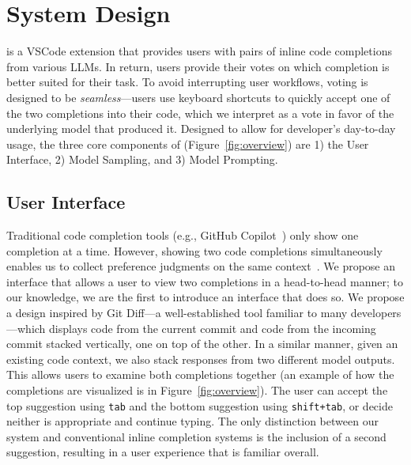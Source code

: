 \section{System Design}\label{sec:system}

\systemName is a VSCode extension that provides users with pairs of inline code completions from various LLMs.
In return, users provide their votes on which completion is better suited for their task.
To avoid interrupting user workflows, voting is designed to be \emph{seamless}---users use keyboard shortcuts to quickly accept one of the two completions into their code, which we interpret as a vote in favor of the underlying model that produced it.
Designed to allow for developer's day-to-day usage, the three core components of \systemName (Figure~\ref{fig:overview}) are 1) the User Interface, 2) Model Sampling, and 3) Model Prompting.




\subsection{User Interface}\label{subsec:pairwise}

Traditional code completion tools (e.g., GitHub Copilot~\citep{Copilot}) only show one completion at a time.
However, showing two code completions simultaneously enables us to collect preference judgments on the same context~\cite{chiang2024chatbot,lu2024wildvision}. 
We propose an interface that allows a user to view two completions in a head-to-head manner; to our knowledge, we are the first to introduce an interface that does so.
We propose a design inspired by Git Diff---a well-established tool familiar to many developers---which displays code from the current commit and code from the incoming commit stacked vertically, one on top of the other.
In a similar manner, given an existing code context, we also stack responses from two different model outputs.
This allows users to examine both completions together (an example of how the completions are visualized is in Figure~\ref{fig:overview}).
The user can accept the top suggestion using \texttt{tab} and the bottom suggestion using \texttt{shift+tab}, or decide neither is appropriate and continue typing.
The only distinction between our system and conventional inline completion systems is the inclusion of a second suggestion, 
resulting in a user experience that is familiar overall. 


